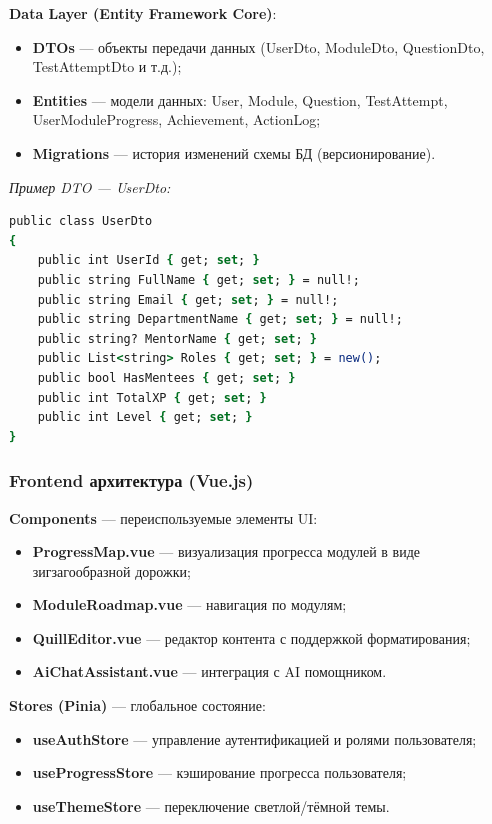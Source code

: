 \textbf{Data Layer (Entity Framework Core)}:
\begin{itemize}
    \item \textbf{DTOs} --- объекты передачи данных (UserDto, ModuleDto, QuestionDto, TestAttemptDto и т.д.);
    \item \textbf{Entities} --- модели данных: User, Module, Question, TestAttempt, UserModuleProgress, Achievement, ActionLog;
    \item \textbf{Migrations} --- история изменений схемы БД (версионирование).
\end{itemize}

\textit{Пример DTO --- UserDto:}
\begin{lstlisting}[language=csh, basicstyle=\ttfamily\small]
public class UserDto
{
    public int UserId { get; set; }
    public string FullName { get; set; } = null!;
    public string Email { get; set; } = null!;
    public string DepartmentName { get; set; } = null!;
    public string? MentorName { get; set; }
    public List<string> Roles { get; set; } = new();
    public bool HasMentees { get; set; }
    public int TotalXP { get; set; }
    public int Level { get; set; }
}
\end{lstlisting}

\subsubsection{Frontend архитектура (Vue.js)}

\textbf{Components} --- переиспользуемые элементы UI:
\begin{itemize}
    \item \textbf{ProgressMap.vue} --- визуализация прогресса модулей в виде зигзагообразной дорожки;
    \item \textbf{ModuleRoadmap.vue} --- навигация по модулям;
    \item \textbf{QuillEditor.vue} --- редактор контента с поддержкой форматирования;
    \item \textbf{AiChatAssistant.vue} --- интеграция с AI помощником.
\end{itemize}

\textbf{Stores (Pinia)} --- глобальное состояние:
\begin{itemize}
    \item \textbf{useAuthStore} --- управление аутентификацией и ролями пользователя;
    \item \textbf{useProgressStore} --- кэширование прогресса пользователя;
    \item \textbf{useThemeStore} --- переключение светлой/тёмной темы.
\end{itemize}

